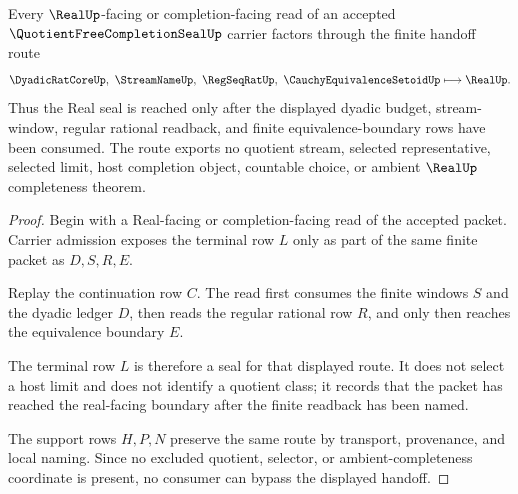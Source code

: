 \begin{theorem}
\label{thm:quotient-free-completion-seal-real-handoff}
Every $\RealUp$-facing or completion-facing read of an accepted $\QuotientFreeCompletionSealUp$ carrier factors through the finite handoff route
$$
\DyadicRatCoreUp,\ \StreamNameUp,\ \RegSeqRatUp,\ \CauchyEquivalenceSetoidUp
\longmapsto
\RealUp .
$$
Thus the Real seal is reached only after the displayed dyadic budget, stream-window, regular rational readback, and finite equivalence-boundary rows have been consumed. The route exports no quotient stream, selected representative, selected limit, host completion object, countable choice, or ambient $\RealUp$ completeness theorem.
\end{theorem}
\begin{proof}
Begin with a Real-facing or completion-facing read of the accepted packet. Carrier admission exposes the terminal row $L$ only as part of the same finite packet as $D,S,R,E$.

Replay the continuation row $C$. The read first consumes the finite windows $S$ and the dyadic ledger $D$, then reads the regular rational row $R$, and only then reaches the equivalence boundary $E$.

The terminal row $L$ is therefore a seal for that displayed route. It does not select a host limit and does not identify a quotient class; it records that the packet has reached the real-facing boundary after the finite readback has been named.

The support rows $H,P,N$ preserve the same route by transport, provenance, and local naming. Since no excluded quotient, selector, or ambient-completeness coordinate is present, no consumer can bypass the displayed handoff.
\end{proof}


